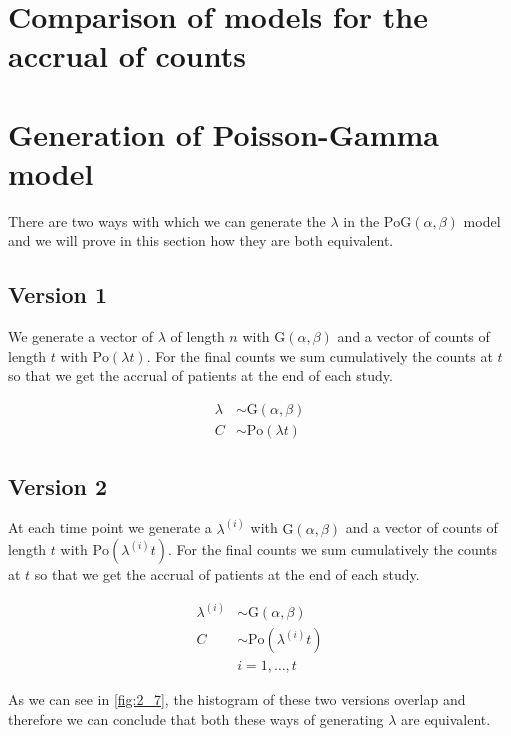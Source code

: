 \section{Comparison of models for the accrual of counts}


\section{Generation of Poisson-Gamma model}

There are two ways with which we can generate the $\lambda$ in the $\textrm{PoG}(\alpha, \beta)$ model and we will prove in this section how they are both equivalent.

\subsection{Version 1}

We generate a vector of $\lambda$ of length $n$ with $\textrm{G}(\alpha, \beta)$ and a vector of counts of length $t$ with $\textrm{Po}(\lambda t)$. For the final counts we sum cumulatively the counts at $t$ so that we get the accrual of patients at the end of each study.

\begin{align*}
\lambda &\sim \textrm{G}(\alpha, \beta) \\
C &\sim \textrm{Po} (\lambda t)
\end{align*}

\subsection{Version 2}

At each time point we generate a $\lambda^{(i)}$ with $\textrm{G}(\alpha, \beta)$ and a vector of counts of length $t$ with $\textrm{Po}(\lambda^{(i)} t)$. For the final counts we sum cumulatively the counts at $t$ so that we get the accrual of patients at the end of each study.

\begin{align*}
\lambda^{(i)} &\sim \textrm{G}(\alpha, \beta) \\
C &\sim \textrm{Po} (\lambda^{(i)} t)\\
& i = 1, \ldots, t 
\end{align*}


As we can see in \ref{fig:2_7}, the histogram of these two versions overlap and therefore we can conclude that both these ways of generating $\lambda$ are equivalent.


